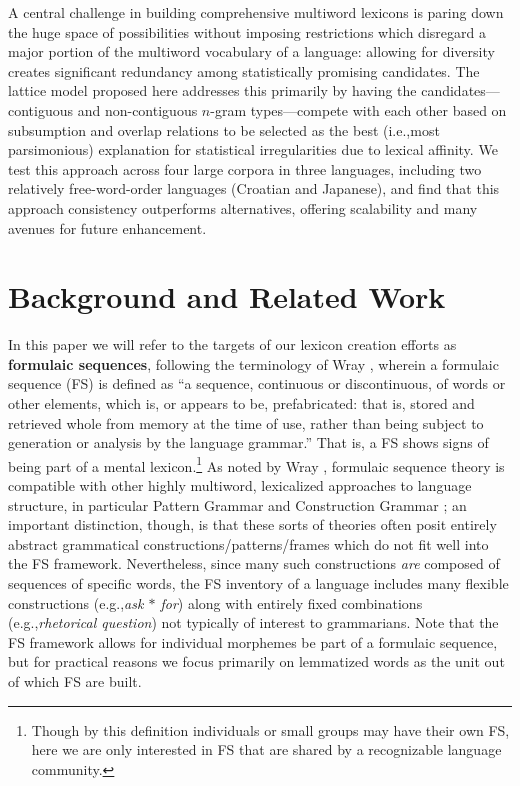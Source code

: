 \documentclass[11pt,letterpaper]{article}
\makeatletter
\def \eg {e.g.,\@ }
\def \ie {i.e.,\@ }
\newcommand{\gap}{$*$\xspace}
\newcommand{\ex}[1]{\textit{#1}\xspace}
\newcommand{\termdef}[1]{\textbf{#1}\xspace}
\makeatother
\begin{document}
A central challenge in building comprehensive multiword lexicons is paring down the huge space of possibilities without imposing restrictions which disregard a major portion of the multiword vocabulary of a language: allowing for diversity creates significant redundancy among statistically promising candidates. The lattice model proposed here addresses this primarily by having the candidates---contiguous and non-contiguous $n$-gram types---compete with each other based on subsumption and overlap relations to be selected as the best (\ie most parsimonious) explanation for statistical irregularities due to lexical affinity. We test this approach across four large corpora in three languages, including two relatively free-word-order languages (Croatian and Japanese), and find that this approach consistency outperforms alternatives, offering scalability and many avenues for future enhancement.




\section{Background and Related Work}

\label{sec:background}

In this paper we will refer to the targets of our lexicon creation efforts as \termdef{formulaic sequences}, following the terminology of Wray , wherein a formulaic sequence (FS) is defined as ``a sequence, continuous or discontinuous, of words or other elements, which is, or appears to be, prefabricated: that is, stored and retrieved whole from memory at the time of use, rather than being subject to generation or analysis by the language grammar.'' That is, a FS shows signs of being part of a mental lexicon.\footnote{Though by this definition individuals or small groups may have their own FS, here we are only interested in FS that are shared by a recognizable language community.} As noted by Wray ,  formulaic sequence theory is compatible with other highly multiword, lexicalized approaches to language structure, in particular Pattern Grammar \cite{PG} and Construction Grammar \cite{ConG}; an important distinction, though, is that these sorts of theories often posit entirely abstract grammatical constructions/patterns/frames which do not fit well into the FS framework. Nevertheless, since many such constructions \textit{are} composed of sequences of specific words, the FS inventory of a language includes many flexible constructions (\eg \ex{ask \gap for}) along with entirely fixed combinations (\eg \ex{rhetorical question}) not typically of interest to grammarians. Note that the FS framework allows for individual morphemes be part of a formulaic sequence, but for practical reasons we focus primarily on lemmatized words as the unit out of which FS are built.
\end{document}
